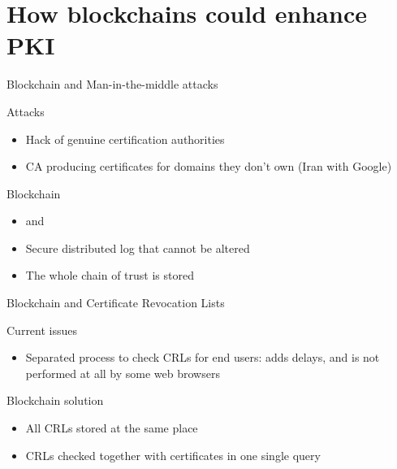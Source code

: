 \section[Blockchains for PKI]{How blockchains could enhance PKI}

\begin{frame}{Blockchain and Man-in-the-middle attacks}
	\begin{alertblock}{Attacks}
		\begin{itemize}
			\item Hack of genuine certification authorities
			\item CA producing certificates for domains they don't own (Iran with Google)
		\end{itemize}
	\end{alertblock}

	\begin{exampleblock}{Blockchain}
		\begin{itemize}
			\item {} and 
			\item Secure distributed log that cannot be altered
			\item The whole chain of trust is stored
		\end{itemize}
	\end{exampleblock}
\end{frame}

\begin{frame}{Blockchain and Certificate Revocation Lists}
	\begin{alertblock}{Current issues}
		\begin{itemize}
			\item Separated process to check CRLs for end users: adds delays, and is not performed at all by some web browsers
		\end{itemize}
	\end{alertblock}

	\begin{exampleblock}{Blockchain solution}
		\begin{itemize}
			\item All CRLs stored at the same place
			\item CRLs checked together with certificates in one single query
		\end{itemize}
	\end{exampleblock}
\end{frame}


